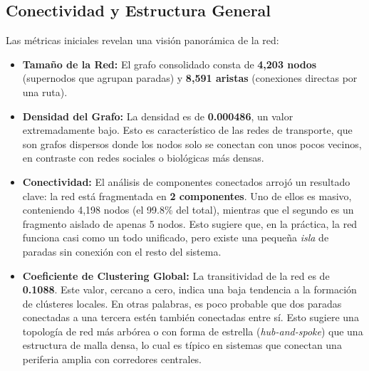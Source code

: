     \subsection{Conectividad y Estructura General}
    Las métricas iniciales revelan una visión panorámica de la red:
    \begin{itemize}
        \item \textbf{Tamaño de la Red:} El grafo consolidado consta de \textbf{4,203 nodos} (supernodos que agrupan paradas) y \textbf{8,591 aristas} (conexiones directas por una ruta).
        \item \textbf{Densidad del Grafo:} La densidad es de \textbf{0.000486}, un valor extremadamente bajo. Esto es característico de las redes de transporte, que son grafos dispersos donde los nodos solo se conectan con unos pocos vecinos, en contraste con redes sociales o biológicas más densas.
        \item \textbf{Conectividad:} El análisis de componentes conectados arrojó un resultado clave: la red está fragmentada en \textbf{2 componentes}. Uno de ellos es masivo, conteniendo 4,198 nodos (el 99.8\% del total), mientras que el segundo es un fragmento aislado de apenas 5 nodos. Esto sugiere que, en la práctica, la red funciona casi como un todo unificado, pero existe una pequeña \textit{isla} de paradas sin conexión con el resto del sistema.
        \item \textbf{Coeficiente de Clustering Global:} La transitividad de la red es de \textbf{0.1088}. Este valor, cercano a cero, indica una baja tendencia a la formación de clústeres locales. En otras palabras, es poco probable que dos paradas conectadas a una tercera estén también conectadas entre sí. Esto sugiere una topología de red más arbórea o con forma de estrella (\textit{hub-and-spoke}) que una estructura de malla densa, lo cual es típico en sistemas que conectan una periferia amplia con corredores centrales.
    \end{itemize}

